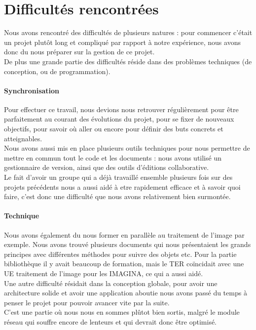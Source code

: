 \documentclass{report}
\begin{document}
		\section{Difficultés rencontrées}
		Nous avons rencontré des difficultés de plusieurs natures : pour commencer c'était un projet plutôt long et compliqué par rapport à notre expérience, nous avons donc du nous préparer sur la gestion de ce projet. \\
		De plus une grande partie des difficultés réside dans des problèmes techniques (de conception, ou de programmation). \\
		
		\paragraph{Synchronisation}
		Pour effectuer ce travail, nous devions nous retrouver régulièrement pour être parfaitement au courant des évolutions du projet, pour se fixer de nouveaux objectifs, pour savoir où aller ou encore pour définir des buts concrets et atteignables. \\
		Nous avons aussi mis en place plusieurs outils techniques pour nous permettre de mettre en commun tout le code et les documents : nous avons utilisé un gestionnaire de version, ainsi que des outils d'éditions collaborative. \\
		Le fait d'avoir un groupe qui a déjà travaillé ensemble plusieurs fois sur des projets précédents nous a aussi aidé à etre rapidement efficace et à savoir quoi faire, c'est donc une difficulté que nous avons relativement bien surmontée. \\
		
		\paragraph{Technique}
		Nous avons également du nous former en parallèle au traitement de l'image par exemple. Nous avons trouvé plusieurs documents qui nous présentaient les grands principes avec différentes méthodes pour suivre des objets etc. Pour la partie bibliothèque il y avait beaucoup de formation, mais le TER coïncidait avec une UE traitement de l'image pour les IMAGINA, ce qui a aussi aidé. \\
		Une autre difficulté résidait dans la conception globale, pour avoir une architecture solide et avoir une application aboutie nous avons passé du temps à penser le projet pour pouvoir avancer vite par la suite. \\ C'est une partie où nous nous en sommes plûtot bien sortis, malgré le module réseau qui souffre encore de lenteurs et qui devrait donc être optimisé. \\
		
\end{document}
